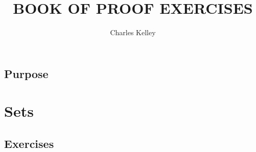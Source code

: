 \documentclass[14pt]{report}
\title{BOOK OF PROOF EXERCISES}
\author{Charles Kelley}
\date{ }
\begin{document}
\maketitle
\tableofcontents{}
\clearpage

\section*{Purpose}

\clearpage

\chapter{Sets}
\section{Exercises}

\end{document}
